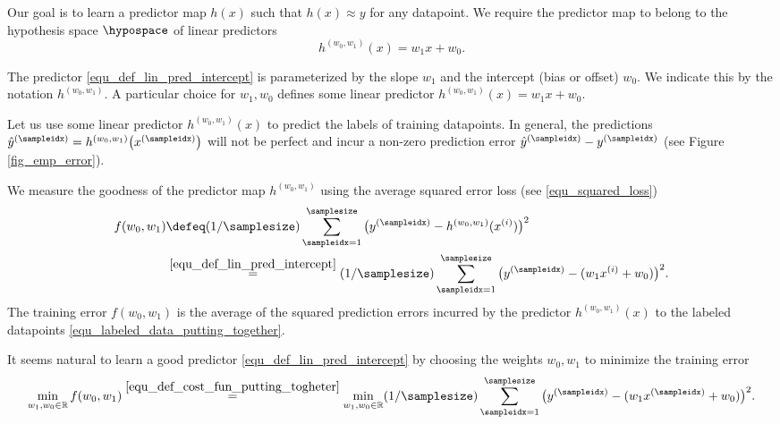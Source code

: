 \documentclass[12pt]{report}
\begin{document}
Our goal is to learn a predictor map $h(x)$ such that $h(x) \approx y$ 
for any datapoint. We require the predictor map to belong to 
the hypothesis space $\hypospace$ of linear predictors 
\begin{equation} 
\label{equ_def_lin_pred_intercept}
h^{(w_{0},w_{1})}(x) = w_{1} x + w_{0}. 
\end{equation}

The predictor \eqref{equ_def_lin_pred_intercept} is parameterized by the slope 
$w_{1}$ and the intercept (bias or offset) $w_{0}$. We indicate this by the 
notation $h^{(w_{0},w_{1})}$. A particular choice for $w_{1},w_{0}$ 
defines some linear predictor $h^{(w_{0},w_{1})}(x) = w_{1}x +w_{0}$. 

Let us use some linear predictor $h^{(w_{0},w_{1})}(x)$ to predict the labels of 
training datapoints. In general, the predictions $\hat{y}^{(\sampleidx)} = h^{(w_{0},w_{1})}\big(x^{(\sampleidx)}\big)$ 
will not be perfect and incur a non-zero prediction error $\hat{y}^{(\sampleidx)} - y^{(\sampleidx)}$ (see Figure \ref{fig_emp_error}).  

We measure the goodness of the predictor map $h^{(w_{0},w_{1})}$ 
using the average squared error loss (see \eqref{equ_squared_loss})
\begin{align}
\label{equ_def_cost_fun_putting_togheter}
f(w_{0},w_{1}) & \defeq (1/\samplesize) \sum_{\sampleidx=1}^{\samplesize} \big( y^{(\sampleidx)} - h^{(w_{0},w_{1})}(x^{(i)})  \big)^{2} \nonumber \\
& \stackrel{\eqref{equ_def_lin_pred_intercept}}{=}  (1/\samplesize) \sum_{\sampleidx=1}^{\samplesize} \big( y^{(\sampleidx)} - ( w_{1} x^{(i)} + w_{0}) \big)^{2}. 
\end{align}
The training error $f(w_{0},w_{1})$ is the average of the squared 
prediction errors incurred by the predictor $h^{(w_{0},w_{1})}(x)$ 
to the labeled datapoints \eqref{equ_labeled_data_putting_together}. 

It seems natural to learn a good predictor \eqref{equ_def_lin_pred_intercept} 
by choosing the weights $w_{0},w_{1}$ to minimize the training error 
\begin{equation}
\min_{w_{1},w_{0} \in \mathbb{R}} f(w_{0},w_{1}) \stackrel{\eqref{equ_def_cost_fun_putting_togheter}}{=} \min_{w_{1},w_{0} \in \mathbb{R}}   (1/\samplesize) \sum_{\sampleidx=1}^{\samplesize} \big( y^{(\sampleidx)} - ( w_{1} x^{(\sampleidx)} + w_{0}) \big)^{2}.
\end{equation} 
\end{document}
